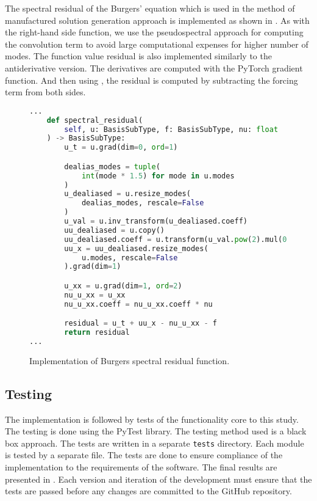 The spectral residual of the Burgers' equation which is used in the method of manufactured solution generation approach is implemented as shown in . As with the right-hand side function, we use the pseudospectral approach for computing the convolution term to avoid large computational expenses for higher number of modes. The function value residual is also implemented similarly to the antiderivative version. The derivatives are computed with the PyTorch gradient function. And then using , the residual is computed by subtracting the forcing term from both sides.

\begin{figure}[H]
  \centering
  \begin{lstlisting}[language=Python]
...
    def spectral_residual(
        self, u: BasisSubType, f: BasisSubType, nu: float
    ) -> BasisSubType:
        u_t = u.grad(dim=0, ord=1)

        dealias_modes = tuple(
            int(mode * 1.5) for mode in u.modes
        )
        u_dealiased = u.resize_modes(
            dealias_modes, rescale=False
        )
        u_val = u.inv_transform(u_dealiased.coeff)
        uu_dealiased = u.copy()
        uu_dealiased.coeff = u.transform(u_val.pow(2).mul(0.5))
        uu_x = uu_dealiased.resize_modes(
            u.modes, rescale=False
        ).grad(dim=1)

        u_xx = u.grad(dim=1, ord=2)
        nu_u_xx = u_xx
        nu_u_xx.coeff = nu_u_xx.coeff * nu

        residual = u_t + uu_x - nu_u_xx - f
        return residual
...
  \end{lstlisting}
  \caption{Implementation of Burgers spectral residual function.}\label{fig:burgers_spectral_residual_impl}
\end{figure}

\subsection{Testing}
\noindent The implementation is followed by tests of the functionality core to this study. The testing is done using the PyTest library. The testing method used is a black box approach. The tests are written in a separate \verb|tests| directory. Each module is tested by a separate file. The tests are done to ensure compliance of the implementation to the requirements of the software. The final results are presented in . Each version and iteration of the development must ensure that the tests are passed before any changes are committed to the GitHub repository.

